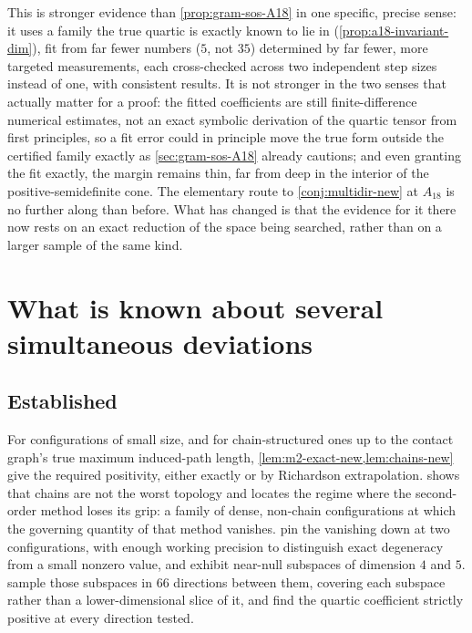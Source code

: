 \documentclass[11pt,reqno]{amsart}
\renewcommand{\_}{\origunderscore\allowbreak}
\numberwithin{equation}{section}
\theoremstyle{plain}
\theoremstyle{definition}
\theoremstyle{remark}
\begin{document}
This is stronger evidence than \cref{prop:gram-sos-A18} in one specific,
precise sense: it uses a family the true quartic is exactly known to lie
in (\cref{prop:a18-invariant-dim}), fit from far fewer numbers ($5$, not
$35$) determined by far fewer, more targeted measurements, each
cross-checked across two independent step sizes instead of one, with
consistent results. It is not stronger in the two senses that actually
matter for a proof: the fitted coefficients are still finite-difference
numerical estimates, not an exact symbolic derivation of the quartic
tensor from first principles, so a fit error could in principle move the
true form outside the certified family exactly as
\cref{sec:gram-sos-A18} already cautions; and even granting the fit
exactly, the margin remains thin, far from deep in the interior of the
positive-semidefinite cone. The elementary route to
\cref{conj:multidir-new} at $A_{18}$ is no further along than before.
What has changed is that the evidence for
it there now rests on an exact reduction of the space being searched,
rather than on a larger sample of the same kind.
\section{What is known about several simultaneous deviations}\label{sec:multidir-scope-summary}

\subsection{Established}

For configurations of small size, and for chain-structured ones up to
the contact graph's true maximum induced-path length,
\cref{lem:m2-exact-new,lem:chains-new} give the required positivity,
either exactly or by Richardson extrapolation.
 shows that chains are not the worst
topology and locates the regime where the second-order method loses its
grip: a family of dense, non-chain configurations at which the
governing quantity of that method vanishes.
pin the vanishing down at two configurations, with enough working
precision to distinguish exact degeneracy from a small nonzero value,
and exhibit near-null subspaces of dimension $4$ and $5$.
 sample those
subspaces in $66$ directions between them, covering each subspace rather
than a lower-dimensional slice of it, and find the quartic coefficient
strictly positive at every direction tested.
\end{document}

